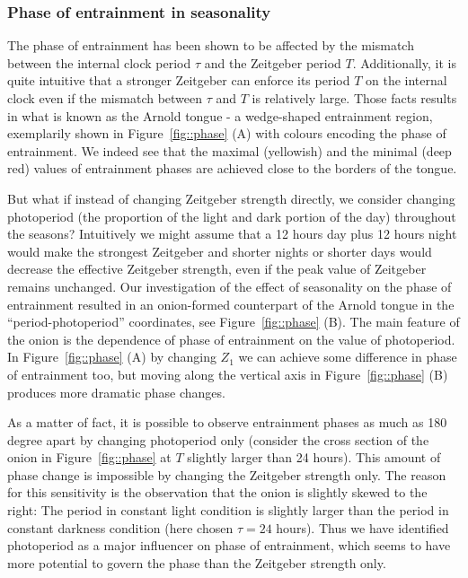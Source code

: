 \subsubsection{Phase of entrainment in seasonality}
The phase of entrainment has been shown to be affected by the mismatch
between the internal clock period $\tau$ and the Zeitgeber period $T$.
Additionally, it is quite intuitive that a stronger Zeitgeber can
enforce its period $T$ on the internal clock even if the mismatch
between $\tau$ and $T$ is relatively large. Those facts results in
what is known as the Arnold tongue - a wedge-shaped entrainment
region, exemplarily shown in Figure~\ref{fig::phase} (A) with colours
encoding the phase of entrainment. We indeed see that the maximal
(yellowish) and the minimal (deep red) values of entrainment phases
are achieved close to the borders of the tongue.

But what if instead of changing Zeitgeber strength directly, we
consider changing photoperiod (the proportion of the light and dark
portion of the day) throughout the seasons? Intuitively we might
assume that a 12 hours day plus 12 hours night would make the
strongest Zeitgeber and shorter nights or shorter days would decrease
the effective Zeitgeber strength, even if the peak value of Zeitgeber
remains unchanged. Our investigation of the effect of seasonality on
the phase of entrainment resulted in an onion-formed counterpart of
the Arnold tongue in the ``period-photoperiod'' coordinates, see
Figure~\ref{fig::phase} (B). The main feature of the onion is the
dependence of phase of entrainment on the value of photoperiod. In
Figure~\ref{fig::phase} (A) by changing $Z_1$ we can achieve some
difference in phase of entrainment too, but moving along the vertical
axis in Figure~\ref{fig::phase} (B) produces more dramatic phase
changes.

As a matter of fact, it is possible to observe entrainment phases as
much as 180 degree apart by changing photoperiod only (consider the
cross section of the onion in Figure~\ref{fig::phase} at $T$ slightly
larger than 24 hours). This amount of phase change is impossible by
changing the Zeitgeber strength only. The reason for this sensitivity
is the observation that the onion is slightly skewed to the right: The
period in constant light condition is slightly larger than the period
in constant darkness condition (here chosen $\tau = 24$ hours). Thus
we have identified photoperiod as a major influencer on phase of
entrainment, which seems to have more potential to govern the phase
than the Zeitgeber strength only.

